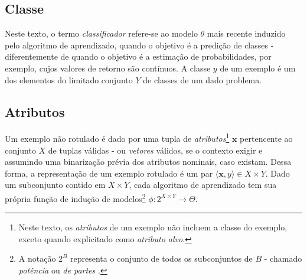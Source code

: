 \subsection{Classe}\label{defcla}
Neste texto, o termo \textit{classificador} refere-se ao modelo $\theta$ mais recente induzido pelo algoritmo de aprendizado, quando o objetivo é a predição de classes - diferentemente de quando o objetivo é a estimação de probabilidades, por exemplo, cujos valores de retorno são contínuos.
A classe $y$ de um exemplo é um dos elementos do limitado conjunto $Y$ de classes de um dado problema.

\subsection{Atributos}\label{defatr}
Um exemplo não rotulado é dado por uma tupla de \textit{atributos}\footnote{Neste texto, os \textit{atributos} de um exemplo não incluem a classe do exemplo, exceto quando explicitado como \textit{atributo alvo}.} $\bm{x}$ pertencente ao conjunto $X$ de tuplas válidas - ou \textit{vetores} válidos, se o contexto exigir e assumindo uma binarização prévia dos atributos nominais, caso existam.
Dessa forma, a representação de um exemplo rotulado é um par
$\langle \bm{x}, y \rangle \in X\times Y$.
Dado um subconjunto contido em $X \times Y$, cada algoritmo de aprendizado tem sua própria 
função de indução de modelos\footnote{A notação $2^B$ representa o conjunto de todos os subconjuntos de $B$ - chamado \textit{potência} ou \textit{de partes} \cite{devlin2012joy}.}
$\phi\colon 2^{X\times Y} \rightarrow \Theta$.

